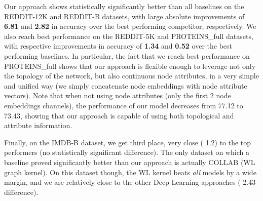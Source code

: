 \documentclass[runningheads]{llncs}
\begin{document}
\begin{table*}[!h]
\begin{center}
\end{center}
\captionsetup{justification=centering, size=small}
\caption{10-fold CV average test set classification accuracy of our proposed method compared to state-of-the-art graph kernels and graph CNNs on the bioinformatics dataset (PROTEINS\_full).}
\label{tab:results_bio}
\end{table*}

\vspace{-1cm}

Our approach shows statistically significantly better than all baselines on the REDDIT-12K and REDDIT-B datasets, with large absolute improvements of \textbf{6.81} and \textbf{2.82} in accuracy over the best performing competitor, respectively.
We also reach best performance on the REDDIT-5K and PROTEINS\_full datasets, with respective improvements in accuracy of \textbf{1.34} and \textbf{0.52} over the best performing baselines. In particular, the fact that we reach best performance on PROTEINS\_full shows that our approach is flexible enough to leverage not only the topology of the network, but also continuous node attributes, in a very simple and unified way (we simply concatenate node embeddings with node attribute vectors). Note that when not using node attributes (only the first 2 node embeddings channels), the performance of our model decreases from 77.12 to 73.43, showing that our approach is capable of using both topological and attribute information.

Finally, on the IMDB-B dataset, we get third place, very close ( 1.2) to the top performers (no statistically significant difference).
The only dataset on which a baseline proved significantly better than our approach is actually COLLAB (WL graph kernel). On this dataset though, the WL kernel beats \textit{all} models by a wide margin, and we are relatively close to the other Deep Learning approaches ( 2.43 difference).
\end{document}
